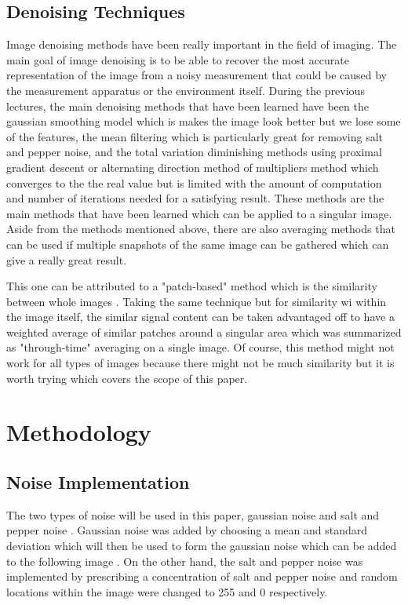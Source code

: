 \documentclass[conference]{IEEEtran}
\begin{document}
\subsection{Denoising Techniques}
Image denoising methods have been really important in the field of imaging. The main goal of image denoising is to be able to recover the most accurate
representation of the image from a noisy measurement that could be caused by the measurement apparatus or the environment itself. During the previous lectures,
the main denoising methods that have been learned have been the gaussian smoothing model \cite{gf} which is makes the image look better but we lose some of the features, 
the mean filtering \cite{mf} which is particularly great for removing salt and pepper noise, and the total variation diminishing methods \cite{tvd} using proximal gradient descent 
or alternating direction method of multipliers method which converges to the the real value but is limited with the amount of computation and number of iterations 
needed for a satisfying result. These methods are the main methods that have been learned which can be applied to a singular image. 
Aside from the methods mentioned above, there are also averaging methods that can be used if multiple snapshots of the same image \cite{ave} can be gathered which can give 
a really great result. 

This one can be attributed to a "patch-based" method which is the similarity between whole images \cite{source}. Taking the same technique but for similarity wi
within the image itself, the similar signal content can be taken advantaged off to have a weighted average of similar patches around a singular area which was summarized
as "through-time" averaging on a single image. Of course, this method might not work for all types of images because there might not be much similarity but it is worth trying
which covers the scope of this paper.

\section{Methodology}
\subsection{Noise Implementation}
The two types of noise will be used in this paper, gaussian noise and salt and pepper noise \cite{mf}. Gaussian noise was added by choosing a mean and standard deviation
which will then be used to form the gaussian noise which can be added to the following image \cite{g}. On the other hand, the salt and pepper noise was implemented by prescribing
a concentration of salt and pepper noise and random locations within the image were changed to 255 and 0 respectively.
\end{document}
